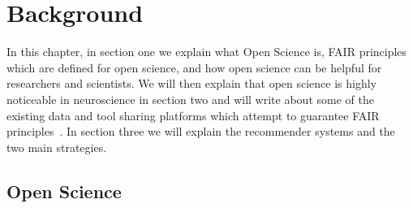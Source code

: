 \chapter{Background}
\label{background}

\cite{abrams2021standards}


In this chapter, in section one we explain what Open Science is, FAIR principles~\cite{FAIR_Principles} which are defined for open science, and how open science can be helpful for researchers and scientists. We will then explain that open science is highly noticeable in neuroscience in section two and will write about some of the existing data and tool sharing platforms which attempt to guarantee FAIR principles~\cite{wilkinson2016fair}. In section three we will explain the recommender systems and the two main strategies.





\section{Open Science}

